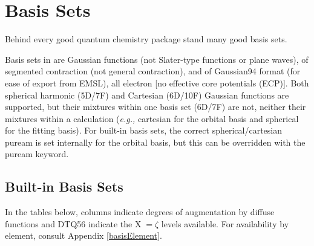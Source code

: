 \section{Basis Sets}

Behind every good quantum chemistry package stand many good basis sets.
 
Basis sets in \PSIfour are Gaussian functions (not Slater-type functions or plane waves), of segmented contraction (not general contraction), and of Gaussian94 format (for ease of export from EMSL), all electron [no effective core potentials (ECP)]. Both spherical harmonic (5D/7F) and Cartesian (6D/10F) Gaussian functions are supported, but their mixtures within one basis set (6D/7F) are not, neither their mixtures within a calculation (\textit{e.g.,} cartesian for the orbital basis and spherical for the fitting basis). For built-in basis sets, the correct spherical/cartesian puream is set internally for the orbital basis, but this can be overridden with the puream keyword. 


\subsection{Built-in Basis Sets}
In the tables below, columns indicate degrees of augmentation by diffuse functions and DTQ56 indicate the X$\;=\zeta$ levels available. For availability by element, consult Appendix \ref{basisElement}.

